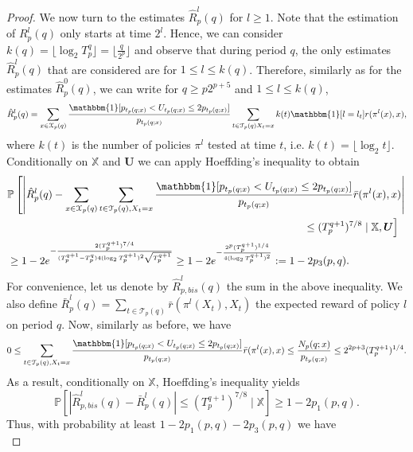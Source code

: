 \documentclass[aos]{imsart}
\theoremstyle{plain}
\theoremstyle{remark}
\newcommand{\Tcal}{\mathcal{T}}
\newcommand{\Xcal}{\mathcal{X}}
\newcommand{\Pbb}{\mathbb{P}}
\newcommand{\Xbb}{\mathbb{X}}
\newcommand{\1}{\mathbbm{1}}%
\newcommand{\mb}[1]{\ensuremath{\boldsymbol{#1}}}
\begin{document}
\begin{proof}
We now turn to the estimates $\hat R_p^l(q)$ for $l\geq 1$. Note that the estimation of $R_p^l(q)$ only starts at time $2^l$. Hence, we can consider $k(q)=\lfloor\log_2 T_p^q\rfloor = \lfloor \frac{q}{2^p}\rfloor$ and observe that during period $q$, the only estimates $\hat R_p^l(q)$ that are considered are for $1\leq l\leq k(q)$. Therefore, similarly as for the estimates $\hat R_p^0(q)$, we can write for $q\geq p2^{p+5}$ and $1\leq l\leq k(q)$,
\begin{equation*}
    \hat R_p^l(q) = \sum_{x\in\Xcal_p(q)} \frac{\1[p_{t_p(q;x)}< U_{t_p(q;x)}\leq 2p_{t_p(q;x)}]}{p_{t_p(q;x)}} \sum_{t\in\Tcal_p(q) X_t=x}  k(t)\1[l=l_t] r(\pi^l(x), x),
\end{equation*}
where $k(t)$ is the number of policies $\pi^l$ tested at time $t$, i.e. $k(t) = \lfloor \log_2 t\rfloor$. Conditionally on $\Xbb$ and $\mb U$ we can apply Hoeffding's inequality to obtain
\begin{align*}
    &\Pbb\left[\left|\hat R_p^l(q) - \sum_{x\in\Xcal_p(q)} \sum_{t\in\Tcal_p(q), X_t=x} \frac{\1[p_{t_p(q;x)}< U_{t_p(q;x)}\leq 2p_{t_p(q;x)}]}{p_{t_p(q;x)}}  \bar r(\pi^l(x), x) \right| \right.\\
    &\quad\quad\quad\quad\quad\quad\quad\quad\quad\quad\quad\quad\quad\quad\quad\quad\quad\quad\quad\quad\quad\quad\quad\quad\quad\quad\quad\quad \left.\leq (T_p^{q+1})^{7/8}\mid \Xbb,\mb U\right]\\
    &\geq 1- 2e^{-\frac{2(T_p^{q+1})^{7/4}}{(T_p^{q+1}-T_p^q)4(\log_2 T_p^{q+1})^2 \sqrt {T_p^{q+1}}}} \geq 1-2e^{-\frac{2^p(T_p^{q+1})^{1/4}}{4(\log_2 T_p^{q+1})^2}}:=1-2p_3(p,q).
\end{align*}
For convenience, let us denote by $\hat R^l_{p,bis}(q)$ the sum in the above inequality. We also define $\bar R^l_p(q) =\sum_{t\in\Tcal_p(q)} \bar r(\pi^l(X_t), X_t)$ the expected reward of policy $l$ on period $q$. Now, similarly as before, we have
\begin{equation*}
    0\leq \sum_{t\in\Tcal_p(q), X_t=x} \frac{\1[p_{t_p(q;x)}< U_{t_p(q;x)}\leq 2p_{t_p(q;x)}]}{p_{t_p(q;x)}}  \bar r(\pi^l(x), x) \leq \frac{N_p(q;x)}{p_{t_p(q;x)}}\leq 2^{2p+3} (T_p^{q+1})^{1/4}.
\end{equation*}
As a result, conditionally on $\Xbb$, Hoeffding's inequality yields
\begin{equation*}
    \Pbb[| \hat R^l_{p,bis}(q) - \bar R^l_p(q) |\leq (T_p^{q+1})^{7/8}\mid \Xbb]    \geq 1- 2p_1(p,q).
\end{equation*}
Thus, with probability at least $1-2p_1(p,q)-2p_3(p,q)$ we have
\begin{equation}\label{eq:exp1_estimates}

\end{equation}
\end{proof}
\end{document}
